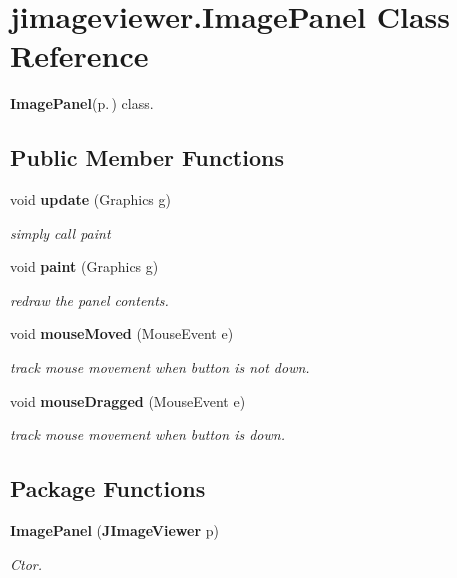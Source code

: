 \section{jimageviewer.Image\-Panel Class Reference}
\label{classjimageviewer_1_1_image_panel}
{\bf Image\-Panel}{\rm (p.\,\pageref{classjimageviewer_1_1_image_panel})} class.  


\subsection*{Public Member Functions}
\begin{CompactItemize}
\item 
void {\bf update} (Graphics g)
\begin{CompactList}\small\item\em simply call paint \item\end{CompactList}\item 
void {\bf paint} (Graphics g)
\begin{CompactList}\small\item\em redraw the panel contents. \item\end{CompactList}\item 
void {\bf mouse\-Moved} (Mouse\-Event e)
\begin{CompactList}\small\item\em track mouse movement when button is not down. \item\end{CompactList}\item 
void {\bf mouse\-Dragged} (Mouse\-Event e)
\begin{CompactList}\small\item\em track mouse movement when button is down. \item\end{CompactList}\end{CompactItemize}
\subsection*{Package Functions}
\begin{CompactItemize}
\item 
{\bf Image\-Panel} ({\bf JImage\-Viewer} p)
\begin{CompactList}\small\item\em Ctor. \item\end{CompactList}\end{CompactItemize}
